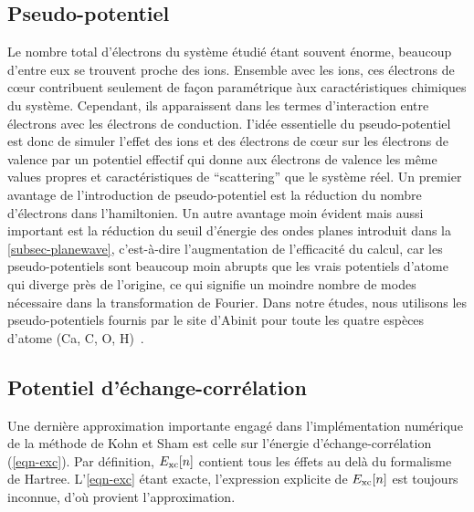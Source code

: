 \subsection{Pseudo-potentiel}
\label{subsec-pseudo}
Le nombre total d'électrons du système étudié étant souvent énorme,
beaucoup d'entre eux se trouvent proche des ions.
Ensemble avec les ions, ces électrons de cœur contribuent seulement de façon paramétrique
àux caractéristiques chimiques du système.
Cependant, ils apparaissent dans les termes d'interaction entre électrons avec les électrons de conduction.
I'idée essentielle du pseudo-potentiel est donc de simuler l'effet des ions et des électrons de cœur
sur les électrons de valence par un potentiel effectif qui donne aux électrons de valence
les même values propres et caractéristiques de ``scattering'' que le système réel.
Un premier avantage de l'introduction de pseudo-potentiel est la réduction du nombre d'électrons dans l'hamiltonien.
Un autre avantage moin évident mais aussi important est la réduction du seuil d'énergie des ondes planes introduit dans la \cref{subsec-planewave},
c'est-à-dire l'augmentation de l'efficacité du calcul, car les pseudo-potentiels sont beaucoup moin abrupts
que les vrais potentiels d'atome qui diverge près de l'origine,
ce qui signifie un moindre nombre de modes nécessaire dans la transformation de Fourier.
Dans notre études, nous utilisons les pseudo-potentiels fournis par le site d'Abinit pour toute les
quatre espèces d'atome (Ca, C, O, H)~\cite{Pseudo}.

\subsection{Potentiel d'échange-corrélation}
\label{subsec-xc}
Une dernière approximation importante engagé dans l'implémentation numérique
de la méthode de Kohn et Sham est celle sur l'énergie d'échange-corrélation (\cref{eqn-exc}).
Par définition, $E_{\textnormal{xc}}[n]$ contient tous les éffets au delà du formalisme de Hartree.
L'\cref{eqn-exc} étant exacte, l'expression explicite de $E_{\textnormal{xc}}[n]$ est toujours inconnue,
d'où provient l'approximation.

